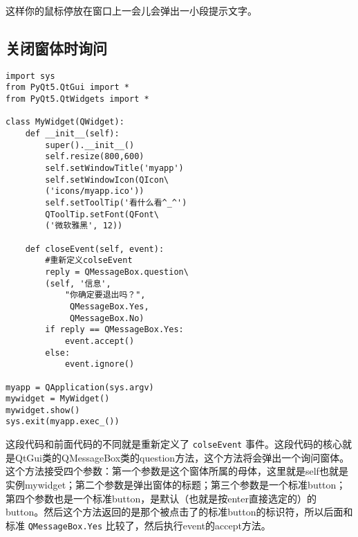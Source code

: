 \documentclass[11pt,oneside]{article}
\begin{document}
这样你的鼠标停放在窗口上一会儿会弹出一小段提示文字。

\subsection{关闭窗体时询问}
\label{sec:orgheadline9}
\begin{verbatim}
import sys
from PyQt5.QtGui import *
from PyQt5.QtWidgets import *

class MyWidget(QWidget):
    def __init__(self):
        super().__init__()
        self.resize(800,600)
        self.setWindowTitle('myapp')
        self.setWindowIcon(QIcon\
        ('icons/myapp.ico'))
        self.setToolTip('看什么看^_^')
        QToolTip.setFont(QFont\
        ('微软雅黑', 12))

    def closeEvent(self, event):
        #重新定义colseEvent
        reply = QMessageBox.question\
        (self, '信息',
            "你确定要退出吗？",
             QMessageBox.Yes,
             QMessageBox.No)
        if reply == QMessageBox.Yes:
            event.accept()
        else:
            event.ignore()

myapp = QApplication(sys.argv)
mywidget = MyWidget()
mywidget.show()
sys.exit(myapp.exec_())
\end{verbatim}

这段代码和前面代码的不同就是重新定义了 \texttt{colseEvent} 事件。这段代码的核心就是QtGui类的QMessageBox类的question方法，这个方法将会弹出一个询问窗体。这个方法接受四个参数：第一个参数是这个窗体所属的母体，这里就是self也就是实例mywidget；第二个参数是弹出窗体的标题；第三个参数是一个标准button；第四个参数也是一个标准button，是默认（也就是按enter直接选定的）的button。然后这个方法返回的是那个被点击了的标准button的标识符，所以后面和标准 \texttt{QMessageBox.Yes}
 比较了，然后执行event的accept方法。
\end{document}
